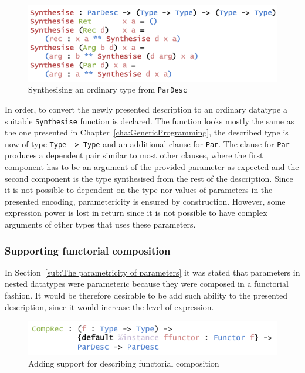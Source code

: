 \documentclass{ituthesis}
\newcommand{\ttconstructor}[1]{\textcolor{constructor-color}{\texttt{#1}}}
\newcommand{\tttype}[1]{\textcolor{type-color}{\texttt{#1}}}
\newcommand{\ttdec}[1]{\textcolor{declared-var-color}{\texttt{#1}}}
\theoremstyle{break}
\begin{document}
\begin{figure}[ht]
\begin{center}
    \includegraphics[scale=0.5]{Figures/ParSynthesising.png}
\end{center}
\caption{Synthesising an ordinary type from \tttype{ParDesc}}
\label{fig:parsynth}
\end{figure}

In order, to convert the newly presented description to an ordinary datatype a suitable \ttdec{Synthesise} function is declared.
The function looks mostly the same as the one presented in Chapter~\ref{cha:GenericProgramming}, the described type is now of type \tttype{Type}\texttt{ -> }\tttype{Type}
and an additional clause for \ttconstructor{Par}.
The clause for \ttconstructor{Par} produces a dependent pair similar to most other clauses, where the first component has to be an argument of the provided parameter as expected
and the second component is the type synthesised from the rest of the description.
Since it is not possible to dependent on the type nor values of parameters in the presented encoding, parametericity is ensured by construction.
However, some expression power is lost in return since it is not possible to have complex arguments of other types that uses these parameters.

\subsubsection{Supporting functorial composition}
\label{ssub:Supporting functorial composition}
In Section~\ref{sub:The parametricity of parameters} it was stated that parameters in nested datatypes were parameteric
because they were composed in a functorial fashion.
It would be therefore desirable to be add such ability to the presented description, since it would increase the level of expression.

\begin{figure}[ht]
\begin{center}
    \includegraphics[scale=0.5]{Figures/ParDescriptionTypeExtended.png}
\end{center}
\caption{Adding support for describing functorial composition}
\label{fig:pardescex}
\end{figure}
\end{document}
